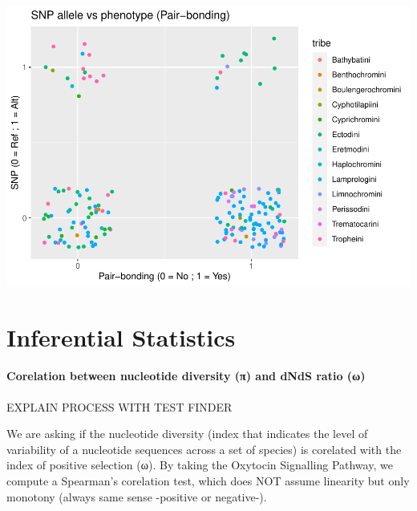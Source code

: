 \documentclass[
]{article}
\begin{document}
\includegraphics{RMD_file_files/figure-latex/unnamed-chunk-8-1.pdf}

\hypertarget{inferential-statistics}{%
\section{Inferential Statistics}\label{inferential-statistics}}

\hypertarget{corelation-between-nucleotide-diversity-ux3c0-and-dnds-ratio-ux3c9}{%
\paragraph{Corelation between nucleotide diversity (π) and dNdS ratio
(ω)}\label{corelation-between-nucleotide-diversity-ux3c0-and-dnds-ratio-ux3c9}}

EXPLAIN PROCESS WITH TEST FINDER

We are asking if the nucleotide diversity (index that indicates the
level of variability of a nucleotide sequences across a set of species)
is corelated with the index of positive selection (ω). By taking the
Oxytocin Signalling Pathway, we compute a Spearman's corelation test,
which does NOT assume linearity but only monotony (always same sense
-positive or negative-).
\end{document}
